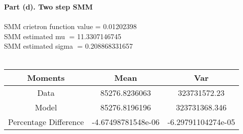 \documentclass[letterpaper,12pt]{article}
\theoremstyle{definition}
\begin{document}
\begin{enumerate}
  \textbf{Part (d). Two step SMM}
\\ \\
SMM crietron function value = 0.01202398 \\
SMM estimated mu = 11.3307146745 \\
SMM estimated sigma = 0.208868331657 \\
\\
\begin{center}
\begin{tabular}{ c|c|c }
 Moments & Mean & Var \\
 \hline
 Data & 85276.8236063 & 323731572.23 \\
 Model & 85276.8196196 & 323731368.346 \\
 Percentage Difference & -4.67498781548e-06 & -6.29791104274e-05
\end{tabular}
\end{center}
\\ \\
\begin{figure}[H]\centering\captionsetup{width=4.0in}
\end{figure}
\end{enumerate}
\end{document}

